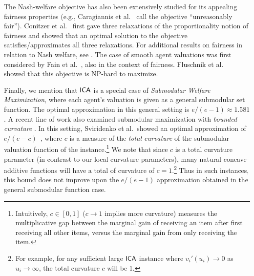  The Nash-welfare objective has also been extensively studied for its appealing fairness properties (e.g.,  Caragiannis et al.~\cite{caragiannis2019unreasonable} call the objective ``unreasonably fair'').  Conitzer et al.~\cite{conitzer2017fair} first gave three relaxations of the proportionality notion of fairness and showed that an optimal solution to the objective satisfies/approximates all three relaxations. For additional results on fairness in relation to Nash welfare, see \cite{barman2018finding, plaut2020almost, mcglaughlin2020improving}. The case of smooth agent valuations was first considered by Fain et al.~\cite{fain2018fair}, also in the context of fairness. Fluschnik et al.~\cite{fluschnik2019fair} showed that this objective is NP-hard to maximize.



Finally, we mention that $\mathsf{ICA}$ is a special case of {\em Submodular Welfare Maximization}, 
where each agent's valuation is given as a general submodular set function.
The optimal approximation in this general setting is $e/(e-1) \approx 1.581$ \cite{vondrak2008optimal, khot2005inapproximability}.
A recent line of work also examined  submodular maximization with {\em bounded curvature}  \cite{conforti1984submodular, Sviridenko2015OptimalAF, vondrak2010submodularity}. 
In this setting, Sviridenko et al.\ showed an optimal approximation of $e/(e-c)$~\cite{Sviridenko2015OptimalAF}, where $c$ is a measure of the {\em total curvature} of the submodular valuation function of the instance.\footnote{Intuitively, $c \in [0,1]$ ($c \rightarrow 1$ implies more curvature) measures the multiplicative gap between the marginal gain of receiving an item after first receiving all other items, versus the marginal gain from only receiving the item.} 
We note that since $c$ is a total curvature parameter (in contrast to our local curvature parameters), many natural concave-additive functions will have a total of curvature of $c=1$.\footnote{For example, for any sufficient large $\mathsf{ICA}$ instance where $v_i'(u_i) \rightarrow 0$ as $u_i \rightarrow \infty$, the total curvature $c$ will be 1.}  Thus in such instances, this bound does not improve upon the $e/(e-1)$ approximation obtained in the general submodular function case.

